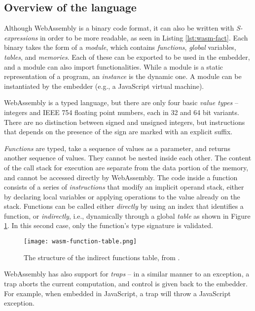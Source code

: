 \subsection{Overview of the language}

Although WebAssembly is a binary code format, it can also be written with \textit{S-expressions}
in order to be more readable, as seen in Listing \ref{lst:wasm-fact}.
Each binary takes the form of a \textit{module}, which contains \textit{functions}, \textit{global} variables,
\textit{tables}, and \textit{memories}. Each of these can be exported to be used in the embedder, and a module can also import functionalities.
While a module is a static representation of a program, an \textit{instance} is the dynamic one.
A module can be instantiated by the embedder (e.g., a JavaScript virtual machine).

WebAssembly is a typed language, but there are only four basic \textit{value types} -- integers and IEEE 754 floating
point numbers, each in 32 and 64 bit variants. There are no distinction between signed and unsigned integers,
but instructions that depends on the presence of the sign are marked with an explicit suffix.

\textit{Functions} are typed, take a sequence of values as a parameter, and returns another sequence of values.
They cannot be nested inside each other. The content of the call stack for execution are separate from the data
portion of the memory, and cannot be accessed directly by WebAssembly.
The code inside a function consists of a series of \textit{instructions} that modify an implicit operand stack,
either by declaring local variables or applying operations to the value already on the stack.
Functions can be called either \textit{directly} by using an index that identifies a function, or \textit{indirectly},
i.e., dynamically through a global \textit{table} as shown in Figure \ref{fig:indirect-function-table-structure}.
In this second case, only the function's type signature is validated.

\begin{figure}[ht]
  \centering
  \texttt{[image: wasm-function-table.png]}
  \caption{The structure of the indirect functions table, from \cite{binary-security-wasm-2020}.}
  \label{fig:indirect-function-table-structure}
\end{figure}

WebAssembly has also support for \textit{traps} -- in a similar manner to an exception, a trap aborts the current
computation, and control is given back to the embedder. For example, when embedded in JavaScript, a trap will
throw a JavaScript exception.

